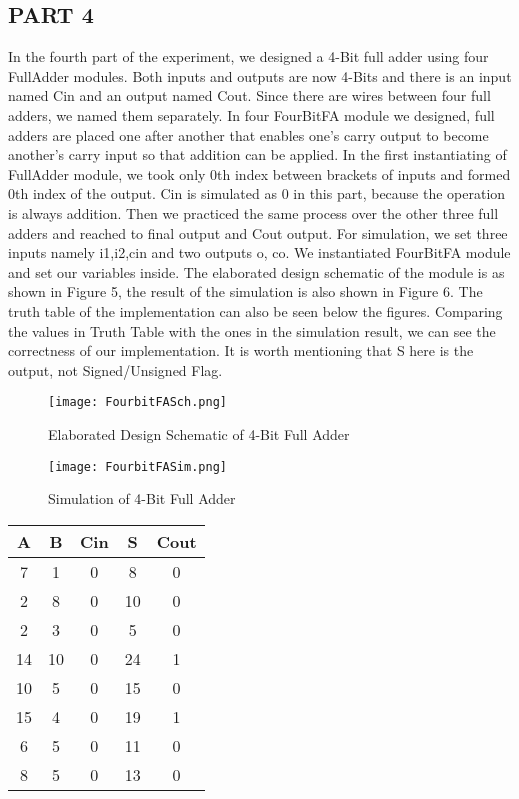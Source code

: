 \documentclass[pdftex,12pt,a4paper]{article}
\begin{document}
\subsection{PART 4}
In the fourth part of the experiment, we designed a 4-Bit full adder using four FullAdder modules. Both inputs and outputs are now 4-Bits and there is an input named Cin and an output named Cout. Since there are wires between four full adders, we named them separately. In four FourBitFA module we designed, full adders are placed one after another that enables one's carry output to become another's carry input so that addition can be applied. In the first instantiating of FullAdder module, we took only 0th index between brackets of inputs and formed 0th index of the output. Cin is simulated as 0 in this part, because the operation is always addition. Then we practiced the same process over the other three full adders and reached to final output and Cout output. For simulation, we set three inputs namely i1,i2,cin and two outputs o, co. We instantiated FourBitFA module and set our variables inside. The elaborated design schematic of the module is as shown in Figure 5, the result of the simulation is also shown in Figure 6. The truth table of the implementation can also be seen below the figures. Comparing the values in Truth Table with the ones in the simulation result, we can see the correctness of our implementation. It is worth mentioning that S here is the output, not Signed/Unsigned Flag.

\begin{figure}[ht]
	\centering
	\texttt{[image: FourbitFASch.png]}
	\caption{Elaborated Design Schematic of 4-Bit Full Adder}
	\label{fig1}
\end{figure}

\begin{figure}[ht]
	\centering
	\texttt{[image: FourbitFASim.png]}
	\caption{Simulation of 4-Bit Full Adder}
	\label{fig1}
\end{figure}

\begin{center}
 \begin{tabular}{|c|c|c|c|c|} 
 \hline
 A & B & Cin & S & Cout  \\ 
 \hline\hline
 7 & 1  & 0 & 8 & 0\\ 
 \hline
 2 & 8 & 0 & 10 & 0\\
 \hline
 2 & 3 & 0 & 5 & 0\\
 \hline
 14 & 10 & 0 & 24 & 1\\
 \hline
 10 & 5 & 0 & 15 & 0\\
 \hline
 15 & 4 & 0 & 19 & 1\\
 \hline
 6 & 5 & 0 & 11 & 0\\
 \hline
 8 & 5 & 0 & 13 & 0\\
  \hline
\end{tabular}
\end{center}
\end{document}
